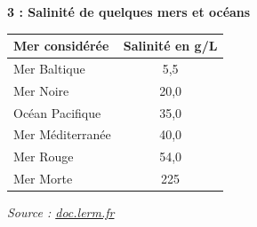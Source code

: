 \begin{multicols}{2}
\begin{doc}
\textbf{3 : Salinité de quelques mers et océans}

\begin{center}
\begin{tabular}{l|c}
Mer considérée & Salinité en g/L \\
\hline
Mer Baltique   & 5{,}5 \\
Mer Noire       & 20{,}0 \\
Océan Pacifique & 35{,}0 \\
Mer Méditerranée & 40{,}0 \\
Mer Rouge & 54{,}0 \\
Mer Morte & 225 \\
\end{tabular}
\end{center}

\flushright \textit{Source : \href{http://doc.lerm.fr/salinite-leau-mer/}{doc.lerm.fr}}
\end{doc}
\end{multicols}

